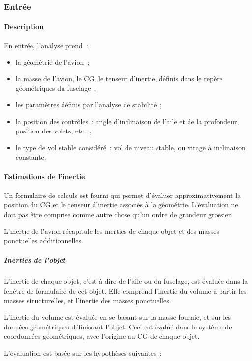 \documentclass[a4paper,twoside,12pt,dvips]{article}
\begin{document}
\subsubsection{Entrée}

\paragraph{Description}

En entrée, l’analyse prend~:

\begin{itemize}
	\item la géométrie de l’avion~;
	\item la masse de l’avion, le CG, le tenseur d’inertie, définis dans le 
	repère géométriques du fuselage~;
	\item les paramètres définis par l’analyse de stabilité~;
	\item la position des contrôles~: angle d’inclinaison de l’aile et de la 
	profondeur, position des volets, etc.~;
	\item le type de vol stable considéré~: vol de niveau stable, ou virage à 
	inclinaison constante.
\end{itemize}

\paragraph{Estimations de l’inertie}

Un formulaire de calculs est fourni qui permet d’évaluer approximativement la position du CG et le tenseur d’inertie associés à la géométrie. L’évaluation ne doit pas être comprise comme autre chose qu’un ordre de grandeur grossier.

L’inertie de l’avion récapitule les inerties de chaque objet et des masses 
ponctuelles additionnelles.

\subparagraph{Inerties de l’objet}

L’inertie de chaque objet, c’est-à-dire de l’aile ou du fuselage, est évaluée
dans la fenêtre de formulaire de cet objet. Elle comprend l’inertie du volume
à partir les masses structurelles, et l’inertie des masses ponctuelles.

L’inertie du volume est évaluée en se basant sur la masse fournie, et sur les
données géométriques définissant l’objet. Ceci est évalué dans le système de
coordonnées géométriques, avec l’origine au CG de chaque objet.

L’évaluation est basée sur les hypothèses suivantes~:
\end{document}
